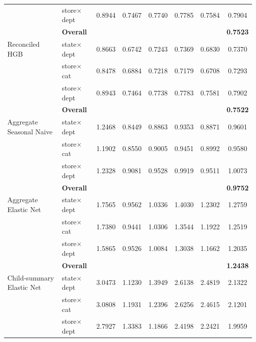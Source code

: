 \begin{table}[H]
\begin{threeparttable}
\begin{tabular}{llccccc|c}
                                   & store$\times$dept      &   0.8944 &   0.7467 &   0.7740 &   0.7785 &   0.7584 &   0.7904 \\
                                   & {\bf Overall} & & & & & & {\bf 0.7523} \\
      \addlinespace
      Reconciled HGB               & state$\times$dept      &   0.8663 &   0.6742 &   0.7243 &   0.7369 &   0.6830 &   0.7370 \\
                                   & store$\times$cat       &   0.8478 &   0.6884 &   0.7218 &   0.7179 &   0.6708 &   0.7293 \\
                                   & store$\times$dept      &   0.8943 &   0.7464 &   0.7738 &   0.7783 &   0.7581 &   0.7902 \\
                                   & {\bf Overall} & & & & & & {\bf 0.7522} \\
      \addlinespace
      Aggregate Seasonal Naive     & state$\times$dept      &   1.2468 &   0.8449 &   0.8863 &   0.9353 &   0.8871 &   0.9601 \\
                                   & store$\times$cat       &   1.1902 &   0.8550 &   0.9005 &   0.9451 &   0.8992 &   0.9580 \\
                                   & store$\times$dept      &   1.2328 &   0.9081 &   0.9528 &   0.9919 &   0.9511 &   1.0073 \\
                                   & {\bf Overall} & & & & & & {\bf 0.9752} \\
      \addlinespace
      Aggregate Elastic Net        & state$\times$dept      &   1.7565 &   0.9562 &   1.0336 &   1.4030 &   1.2302 &   1.2759 \\
                                   & store$\times$cat       &   1.7380 &   0.9441 &   1.0306 &   1.3544 &   1.1922 &   1.2519 \\
                                   & store$\times$dept      &   1.5865 &   0.9526 &   1.0084 &   1.3038 &   1.1662 &   1.2035 \\
                                   & {\bf Overall} & & & & & & {\bf 1.2438} \\
      \addlinespace
      Child-summary Elastic Net    & state$\times$dept      &   3.0473 &   1.1230 &   1.3949 &   2.6138 &   2.4819 &   2.1322 \\
                                   & store$\times$cat       &   3.0808 &   1.1931 &   1.2396 &   2.6256 &   2.4615 &   2.1201 \\
                                   & store$\times$dept      &   2.7927 &   1.3383 &   1.1866 &   2.4198 &   2.2421 &   1.9959 \\

\end{tabular}
\end{threeparttable}
\end{table}
